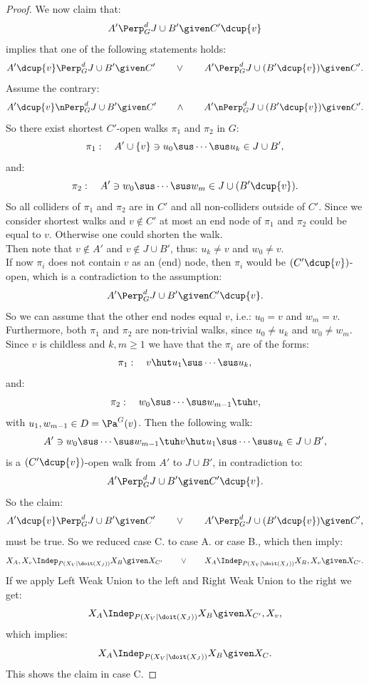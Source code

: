 \begin{Thm}
\begin{proof}
We now claim that:
\[A' \Perp^d_G J \cup B' \given C'\dcup\{v\}\]
implies that one of the following statements holds:
\[  A' \dcup \{v\} \Perp^d_G J \cup B' \given C' \qquad \lor \qquad A' \Perp^d_G J \cup (B' \dcup \{v\}) \given C'. \]
Assume the contrary:
\[  A' \dcup \{v\} \nPerp^d_G J \cup B' \given C' \qquad \land \qquad A' \nPerp^d_G J \cup (B' \dcup \{v\}) \given C'. \]
So there exist shortest $C'$-open walks $\pi_1$ and $\pi_2$ in $G$:
\[ \pi_1:\quad  A' \cup \{v\}\ni u_0 \sus \cdots \sus u_k \in J \cup B',  \]
and:
\[ \pi_2:\quad  A' \ni w_0 \sus \cdots \sus w_m \in J \cup (B' \dcup \{v\}).  \]
So all colliders of $\pi_1$ and $\pi_2$ are in $C'$ and all non-colliders outside of $C'$.
Since we consider shortest walks and $v \notin C'$ at most an end node of $\pi_1$ and $\pi_2$ could be equal to $v$.
Otherwise one could shorten the walk.\\
Then note that $v \notin A'$ and $v \notin J \cup B'$, thus: $u_k \neq v$ and $w_0 \neq v$.\\
If now $\pi_i$ does not contain $v$ as an (end) node, then $\pi_i$ would be $(C'\dcup \{v\})$-open,
which is a contradiction to the assumption:
\[A' \Perp^d_G J \cup B' \given C'\dcup\{v\}.\]
So we can assume that the other end nodes equal $v$, i.e.: $u_0=v$ and $w_m =v$.\\
Furthermore, both $\pi_1$ and $\pi_2$ are non-trivial walks, since $u_0 \neq u_k$ and $w_0 \neq w_m$.
Since $v$ is childless and $k,m \ge 1$ we have that the $\pi_i$ are of the forms:
\[ \pi_1:\quad   v \hut u_1 \sus \cdots \sus u_k,  \]
and:
\[ \pi_2:\quad  w_0 \sus \cdots \sus w_{m-1} \tuh v,  \]
with $u_1, w_{m-1} \in D=\Pa^G(v)$. Then the following walk:
\[ A' \ni  w_0 \sus \cdots \sus w_{m-1} \tuh v \hut u_1 \sus \cdots \sus u_k \in J \cup B',  \]
is a $(C' \dcup \{v\})$-open walk from $A'$ to $J \cup B'$, in contradiction to:
\[A' \Perp^d_G J \cup B' \given C'\dcup\{v\}.\]
So the claim:
\[  A' \dcup \{v\} \Perp^d_G J \cup B' \given C' \qquad \lor \qquad A' \Perp^d_G J \cup (B' \dcup \{v\}) \given C', \]
must be true. 
So we reduced case C. to case A. or case B., which then imply:
\[ X_A,X_v \Indep_{P(X_V|\doit(X_J))}  X_B \given X_{C'} \qquad \lor \qquad X_A \Indep_{P(X_V|\doit(X_J))}  X_B,X_v \given X_{C'}.\]
If we apply Left Weak Union to the left and Right Weak Union to the right we get:
\[ X_A \Indep_{P(X_V|\doit(X_J))}  X_B \given X_{C'},X_v,\]
which implies:
\[ X_A \Indep_{P(X_V|\doit(X_J))}  X_B \given X_C.\]
This shows the claim in case C.
\end{proof}

\end{Thm}

